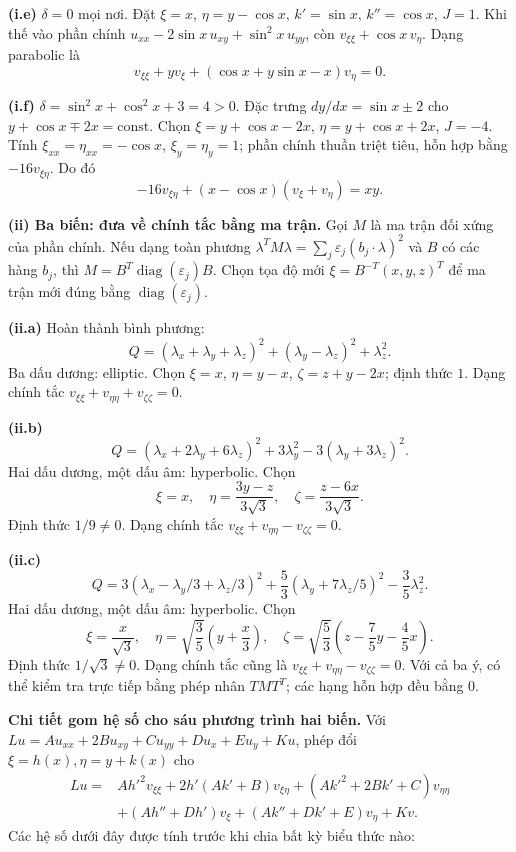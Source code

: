 \textbf{(i.e)} $\delta=0$ mọi nơi. Đặt $\xi=x$, $\eta=y-\cos x$, $k'=\sin x$, $k''=\cos x$, $J=1$. Khi thế vào phần chính $u_{xx}-2\sin x\,u_{xy}+\sin^2x\,u_{yy}$, còn $v_{\xi\xi}+\cos x\,v_\eta$. Dạng parabolic là
\[v_{\xi\xi}+y v_\xi+(\cos x+y\sin x-x)v_\eta=0.\]

\textbf{(i.f)} $\delta=\sin^2x+\cos^2x+3=4>0$. Đặc trưng $dy/dx=\sin x\pm2$ cho $y+\cos x\mp2x=\mathrm{const}$. Chọn $\xi=y+\cos x-2x$, $\eta=y+\cos x+2x$, $J=-4$. Tính $\xi_{xx}=\eta_{xx}=-\cos x$, $\xi_y=\eta_y=1$; phần chính thuần triệt tiêu, hỗn hợp bằng $-16v_{\xi\eta}$. Do đó
\[-16v_{\xi\eta}+(x-\cos x)(v_\xi+v_\eta)=xy.\]

\textbf{(ii) Ba biến: đưa về chính tắc bằng ma trận.} Gọi $M$ là ma trận đối xứng của phần chính. Nếu dạng toàn phương $\lambda^TM\lambda=\sum_j\varepsilon_j(b_j\cdot\lambda)^2$ và $B$ có các hàng $b_j$, thì $M=B^T\operatorname{diag}(\varepsilon_j)B$. Chọn tọa độ mới $\xi=B^{-T}(x,y,z)^T$ để ma trận mới đúng bằng $\operatorname{diag}(\varepsilon_j)$.

\textbf{(ii.a)} Hoàn thành bình phương:
\[Q=(\lambda_x+\lambda_y+\lambda_z)^2+(\lambda_y-\lambda_z)^2+\lambda_z^2.\]
Ba dấu dương: elliptic. Chọn $\xi=x$, $\eta=y-x$, $\zeta=z+y-2x$; định thức $1$. Dạng chính tắc $v_{\xi\xi}+v_{\eta\eta}+v_{\zeta\zeta}=0$.

\textbf{(ii.b)}
\[Q=(\lambda_x+2\lambda_y+6\lambda_z)^2+3\lambda_y^2-3(\lambda_y+3\lambda_z)^2.\]
Hai dấu dương, một dấu âm: hyperbolic. Chọn
\[\xi=x,\quad\eta=\frac{3y-z}{3\sqrt3},\quad\zeta=\frac{z-6x}{3\sqrt3}.\]
Định thức $1/9\ne0$. Dạng chính tắc $v_{\xi\xi}+v_{\eta\eta}-v_{\zeta\zeta}=0$.

\textbf{(ii.c)}
\[Q=3(\lambda_x-\lambda_y/3+\lambda_z/3)^2+\frac53(\lambda_y+7\lambda_z/5)^2-\frac35\lambda_z^2.\]
Hai dấu dương, một dấu âm: hyperbolic. Chọn
\[\xi=\frac{x}{\sqrt3},\quad\eta=\sqrt{\frac35}\left(y+\frac x3\right),\quad
\zeta=\sqrt{\frac53}\left(z-\frac75y-\frac45x\right).\]
Định thức $1/\sqrt3\ne0$. Dạng chính tắc cũng là $v_{\xi\xi}+v_{\eta\eta}-v_{\zeta\zeta}=0$. Với cả ba ý, có thể kiểm tra trực tiếp bằng phép nhân $TMT^T$; các hạng hỗn hợp đều bằng $0$.

\textbf{Chi tiết gom hệ số cho sáu phương trình hai biến.} Với $Lu=Au_{xx}+2Bu_{xy}+Cu_{yy}+Du_x+Eu_y+Ku$, phép đổi $\xi=h(x),\eta=y+k(x)$ cho
\[\begin{aligned}
L u={}&Ah'^2v_{\xi\xi}+2h'(Ak'+B)v_{\xi\eta}
+(Ak'^2+2Bk'+C)v_{\eta\eta}\\
&+(Ah''+Dh')v_\xi+(Ak''+Dk'+E)v_\eta+Kv.
\end{aligned}\]
Các hệ số dưới đây được tính trước khi chia bất kỳ biểu thức nào:

